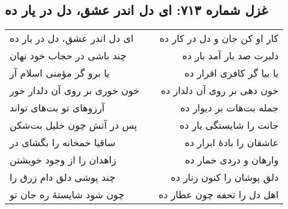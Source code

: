 \begin{center}
\section*{غزل شماره ۷۱۳: ای دل اندر عشق، دل در یار ده}
\label{sec:713}
\begin{longtable}{l p{0.5cm} r}
ای دل اندر عشق، دل در یار ده
&&
کار او کن جان و دل در کار ده
\\
چند باشی در حجاب خود نهان
&&
دلبرت صد بار آمد بار ده
\\
یا برو گر مؤمنی اسلام آر
&&
یا بیا گر کافری اقرار ده
\\
خون خوری بر روی آن دلدار خور
&&
خون دهی بر روی آن دلدار ده
\\
آرزوهای تو بت‌های تواند
&&
جمله بت‌هات بر دیوار ده
\\
پس در آتش چون خلیل بت‌شکن
&&
جانت را شایستگی یار ده
\\
ساقیا خمخانه را بگشای در
&&
عاشقان را بادهٔ ابرار ده
\\
زاهدان را از وجود خویشتن
&&
وارهان و دردی خمار ده
\\
چند پوشی دلق دام زرق را
&&
دلق پوشان را کنون زنار ده
\\
چون شود شایستهٔ ره جان تو
&&
اهل دل را تحفه چون عطار ده
\\
\end{longtable}
\end{center}
